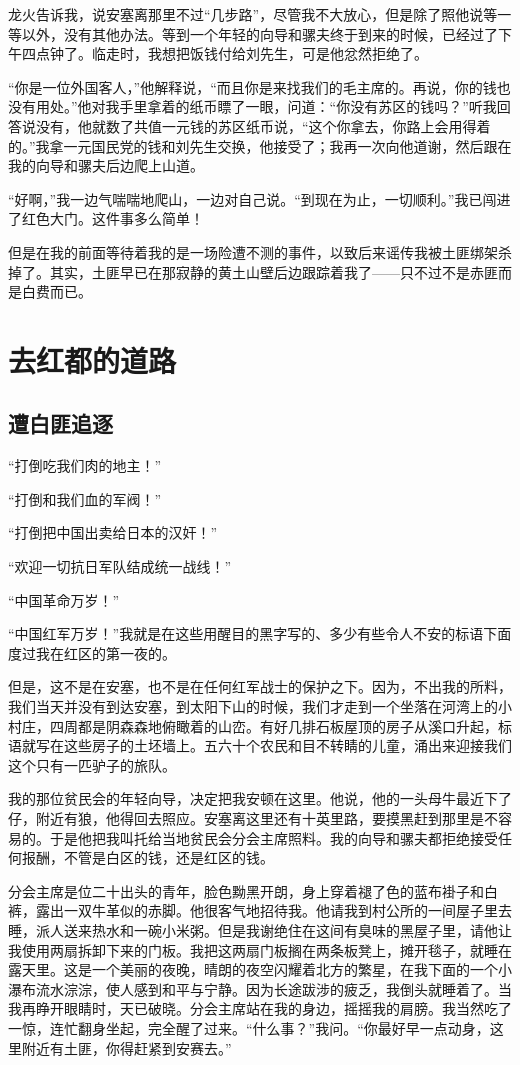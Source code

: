 \documentclass[10pt]{book}
\begin{document}
龙火告诉我，说安塞离那里不过“几步路”，尽管我不大放心，但是除了照他说等一等以外，没有其他办法。等到一个年轻的向导和骡夫终于到来的时候，已经过了下午四点钟了。临走时，我想把饭钱付给刘先生，可是他忿然拒绝了。

“你是一位外国客人，”他解释说，“而且你是来找我们的毛主席的。再说，你的钱也没有用处。”他对我手里拿着的纸币瞟了一眼，问道：“你没有苏区的钱吗？”听我回答说没有，他就数了共值一元钱的苏区纸币说，“这个你拿去，你路上会用得着的。”我拿一元国民党的钱和刘先生交换，他接受了；我再一次向他道谢，然后跟在我的向导和骡夫后边爬上山道。

“好啊，”我一边气喘喘地爬山，一边对自己说。“到现在为止，一切顺利。”我已闯进了红色大门。这件事多么简单！

但是在我的前面等待着我的是一场险遭不测的事件，以致后来谣传我被土匪绑架杀掉了。其实，土匪早已在那寂静的黄土山壁后边跟踪着我了——只不过不是赤匪而是白费而已。

\chapter{去红都的道路}

\section{遭白匪追逐}

“打倒吃我们肉的地主！”

“打倒和我们血的军阀！”

“打倒把中国出卖给日本的汉奸！”

“欢迎一切抗日军队结成统一战线！”

“中国革命万岁！”

“中国红军万岁！”我就是在这些用醒目的黑字写的、多少有些令人不安的标语下面度过我在红区的第一夜的。

但是，这不是在安塞，也不是在任何红军战士的保护之下。因为，不出我的所料，我们当天并没有到达安塞，到太阳下山的时候，我们才走到一个坐落在河湾上的小村庄，四周都是阴森森地俯瞰着的山峦。有好几排石板屋顶的房子从溪口升起，标语就写在这些房子的土坯墙上。五六十个农民和目不转睛的儿童，涌出来迎接我们这个只有一匹驴子的旅队。

我的那位贫民会的年轻向导，决定把我安顿在这里。他说，他的一头母牛最近下了仔，附近有狼，他得回去照应。安塞离这里还有十英里路，要摸黑赶到那里是不容易的。于是他把我叫托给当地贫民会分会主席照料。我的向导和骡夫都拒绝接受任何报酬，不管是白区的钱，还是红区的钱。

分会主席是位二十出头的青年，脸色黝黑开朗，身上穿着褪了色的蓝布褂子和白裤，露出一双牛革似的赤脚。他很客气地招待我。他请我到村公所的一间屋子里去睡，派人送来热水和一碗小米粥。但是我谢绝住在这间有臭味的黑屋子里，请他让我使用两扇拆卸下来的门板。我把这两扇门板搁在两条板凳上，摊开毯子，就睡在露天里。这是一个美丽的夜晚，晴朗的夜空闪耀着北方的繁星，在我下面的一个小瀑布流水淙淙，使人感到和平与宁静。因为长途跋涉的疲乏，我倒头就睡着了。当我再睁开眼睛时，天已破晓。分会主席站在我的身边，摇摇我的肩膀。我当然吃了一惊，连忙翻身坐起，完全醒了过来。“什么事？”我问。“你最好早一点动身，这里附近有土匪，你得赶紧到安赛去。”
\end{document}
